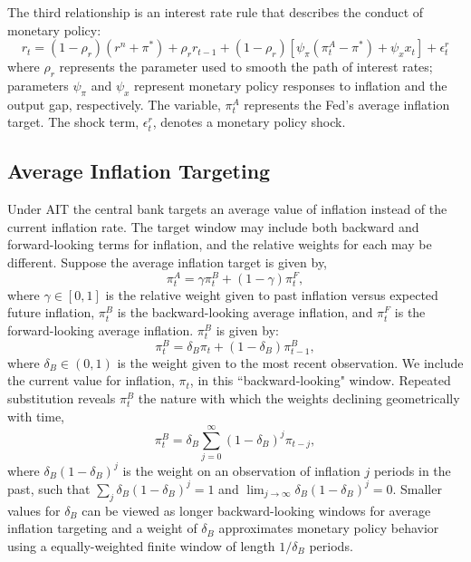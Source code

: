 \documentclass[english,authoryear,12pt]{elsarticle}
\begin{document}
The third relationship is an interest rate rule that describes the conduct of monetary policy:
\begin{equation}\label{eq:TaylorRule}
	r_t = (1-\rho_r)(r^n + \pi^*) + \rho_r r_{t-1} + (1-\rho_r) \left[ \psi_\pi (\pi_t^A - \pi^*) + \psi_x x_t \right] + \epsilon_t^{r}
\end{equation}
where $\rho_r$ represents the parameter used to smooth the path of interest rates; parameters $\psi_\pi$ and $\psi_x$ represent monetary policy responses to inflation and the output gap, respectively. The variable, $\pi_t^A$ represents the Fed's average inflation target. The shock term, $\epsilon_t^r$, denotes a monetary policy shock.

\subsection{Average Inflation Targeting}

Under AIT the central bank targets an average value of inflation instead of the current inflation rate. The target window may include both backward and forward-looking terms for inflation, and the relative weights for each may be different. Suppose the average inflation target is given by,
\begin{equation}
	\pi_t^A = \gamma \pi_t^B + (1-\gamma) \pi_t^F,
\end{equation}
where $\gamma \in [0,1]$ is the relative weight given to past inflation versus expected future inflation, $\pi_t^B$ is the backward-looking average inflation, and $\pi_t^F$ is the forward-looking average inflation. $\pi_t^B$ is given by:
\begin{equation}\label{eq:backward}
	\pi_t^B = \delta_B \pi_t + (1-\delta_B) \pi_{t-1}^B,
\end{equation}
where $\delta_B \in (0,1)$ is the weight given to the most recent observation. We include the current value for inflation, $\pi_t$, in this ``backward-looking" window.  Repeated substitution reveals $\pi_t^B$ the nature with which the weights declining geometrically with time,
\begin{equation}\label{eq:backward_all}
	\pi_t^B = \delta_B \sum_{j=0}^{\infty} (1-\delta_B)^j \pi_{t-j},
\end{equation}
where $\delta_B (1-\delta_B)^j$ is the weight on an observation of inflation $j$ periods in the past, such that $\sum_j \delta_B (1-\delta_B)^j=1$ and $\lim_{j \to \infty} \delta_B (1-\delta_B)^j=0$. Smaller values for $\delta_B$ can be viewed as longer backward-looking windows for average inflation targeting and a weight of $\delta_B$ approximates monetary policy behavior using a equally-weighted finite window of length $1 / \delta_B$ periods.
\end{document}
